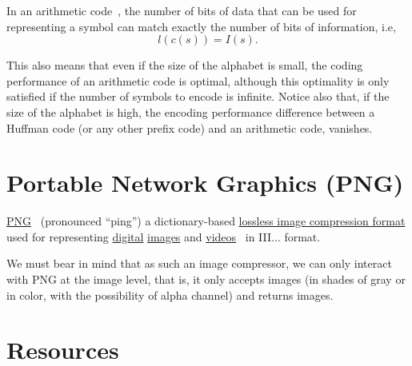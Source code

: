 In an arithmetic code~\cite{vruiz__arithmetic_coding}, the number of
bits of data that can be used for representing a symbol can match
exactly the number of bits of information, i.e,
\begin{equation}
  l(c(s)) = I(s).
\end{equation}

This also means that even if the size of the alphabet is small, the
coding performance of an arithmetic code is optimal, although this
optimality is only satisfied if the number of symbols to encode is
infinite. Notice also that, if the size of the alphabet is high, the
encoding performance difference between a Huffman code (or any other
prefix code) and an arithmetic code, vanishes.

\section{Portable Network Graphics (PNG)}

\href{https://en.wikipedia.org/wiki/Portable_Network_Graphics}{PNG}~\cite{vruiz__PNG}
(pronounced ``ping'') a dictionary-based
\href{https://en.wikipedia.org/wiki/Lossless_compression}{lossless
  image compression format} used for representing
\href{https://en.wikipedia.org/wiki/Digital_data}{digital}
\href{https://en.wikipedia.org/wiki/Digital_image}{images} and
\href{https://en.wikipedia.org/wiki/Video}{videos}~\cite{vruiz__image_video}
in III... format.

We must bear in mind that as such an image compressor, we can only
interact with PNG at the image level, that is, it only accepts images
(in shades of gray or in color, with the possibility of alpha channel)
and returns images.


\section{Resources}

\renewcommand{\addcontentsline}[3]{}%

